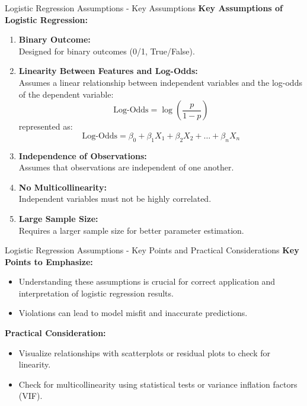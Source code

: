\documentclass[aspectratio=169]{beamer}
\begin{document}
\begin{frame}[fragile]{Logistic Regression Assumptions - Key Assumptions}
  \textbf{Key Assumptions of Logistic Regression:} 
  \begin{enumerate}
    \item \textbf{Binary Outcome:} \\ 
    Designed for binary outcomes (0/1, True/False).
    
    \item \textbf{Linearity Between Features and Log-Odds:} \\ 
    Assumes a linear relationship between independent variables and the log-odds of the dependent variable:
    \begin{equation}
      \text{Log-Odds} = \log\left(\frac{p}{1-p}\right) 
    \end{equation}
    represented as:
    \begin{equation}
      \text{Log-Odds} = \beta_0 + \beta_1 X_1 + \beta_2 X_2 + \ldots + \beta_n X_n
    \end{equation}
    
    \item \textbf{Independence of Observations:} \\ 
    Assumes that observations are independent of one another.
    
    \item \textbf{No Multicollinearity:} \\ 
    Independent variables must not be highly correlated.
    
    \item \textbf{Large Sample Size:} \\ 
    Requires a larger sample size for better parameter estimation.
  \end{enumerate}
\end{frame}

\begin{frame}[fragile]{Logistic Regression Assumptions - Key Points and Practical Considerations}
  \textbf{Key Points to Emphasize:} 
  \begin{itemize}
    \item Understanding these assumptions is crucial for correct application and interpretation of logistic regression results.
    \item Violations can lead to model misfit and inaccurate predictions.
  \end{itemize}
  
  \textbf{Practical Consideration:} 
  \begin{itemize}
    \item Visualize relationships with scatterplots or residual plots to check for linearity.
    \item Check for multicollinearity using statistical tests or variance inflation factors (VIF).
  \end{itemize}
\end{frame}
\end{document}
